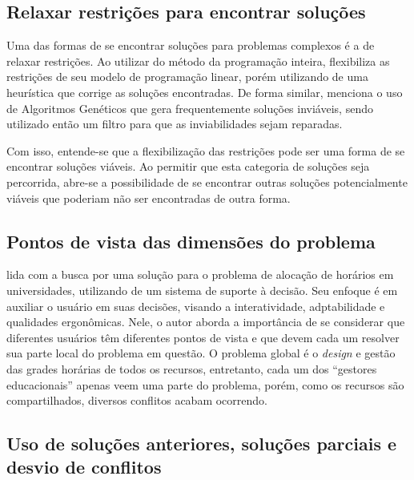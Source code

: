 \subsection{Relaxar restrições para encontrar soluções} \label{ssec:relaxar}                              %

Uma das formas de se encontrar soluções para problemas complexos é a de relaxar restrições. Ao utilizar do método da programação inteira, \cite{dunke_matheuristic_2023} flexibiliza as restrições de seu modelo de programação linear, porém utilizando de uma heurística que corrige as soluções encontradas. De forma similar,  menciona o uso de Algoritmos Genéticos que gera frequentemente soluções inviáveis, sendo utilizado então um filtro para que as inviabilidades sejam reparadas.

Com isso, entende-se que a flexibilização das restrições pode ser uma forma de se encontrar soluções viáveis. Ao permitir que esta categoria de soluções seja percorrida, abre-se a possibilidade de se encontrar outras soluções potencialmente viáveis que poderiam não ser encontradas de outra forma.

\subsection{Pontos de vista das dimensões do problema} \label{ssec:pontos}                                %

 lida com a busca por uma solução para o problema de alocação de horários em universidades, utilizando de um sistema de suporte à decisão. Seu enfoque é em auxiliar o usuário em suas decisões, visando a interatividade, adptabilidade e qualidades ergonômicas. Nele, o autor aborda a importância de se considerar que diferentes usuários têm diferentes pontos de vista e que devem cada um resolver sua parte local do problema em questão. O problema global é o \textit{design} e gestão das grades horárias de todos os recursos, entretanto, cada um dos ``gestores educacionais'' apenas veem uma parte do problema, porém, como os recursos são compartilhados, diversos conflitos acabam ocorrendo.

\subsection{Uso de soluções anteriores, soluções parciais e desvio de conflitos} \label{ssec:parciais}    %


